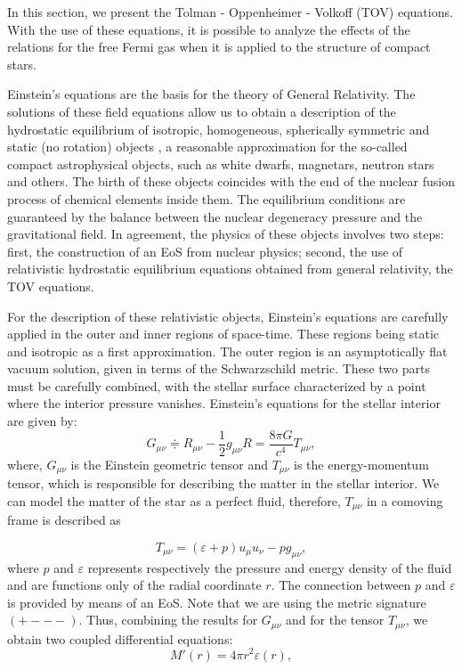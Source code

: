 \documentclass[final,5p,times,twocolumn]{elsarticle}
\begin{document}

In this section, we present the Tolman - Oppenheimer - Volkoff (TOV) equations. With the use of these equations, it is possible to analyze the effects of the  relations for the free Fermi gas when it is applied to the structure of compact stars.

Einstein's equations are the basis for the theory of General Relativity. The solutions of these field equations allow us to obtain a description of the hydrostatic equilibrium of isotropic, homogeneous, spherically symmetric and static (no rotation) objects \cite{Glendenning1997,Carroll2004}, a reasonable approximation for the so-called compact astrophysical objects, such as white dwarfs, magnetars, neutron stars and others. The birth of these objects coincides with the end of the nuclear fusion process of chemical elements inside them. The equilibrium conditions are guaranteed by the balance between the nuclear degeneracy pressure and the gravitational field. In agreement, the physics of these objects involves two steps: first, the construction of an EoS from nuclear physics; second, the use of relativistic hydrostatic equilibrium equations obtained from general relativity, the TOV equations.

For the description of these relativistic objects, Einstein's equations are carefully applied in the outer and inner regions of space-time. These regions being static and isotropic as a first approximation. The outer region is an asymptotically flat vacuum solution, given in terms of the Schwarzschild metric. These two parts must be carefully combined, with the stellar surface characterized by a point where the interior pressure vanishes. Einstein's equations for the stellar interior are given by: 
\begin{equation}
G_{\mu\nu} \doteqdot R_{\mu\nu}-\frac{1}{2}g_{\mu\nu}R = \frac{8\pi G}{c^4} T_{\mu\nu},
\end{equation}
where, $G_{\mu\nu}$ is the Einstein geometric tensor and $T_{\mu\nu}$ is the energy-momentum tensor, which is responsible for describing the matter in the stellar interior. We can model the matter of the star as a perfect fluid, therefore, $T_{\mu\nu}$ in a comoving frame is described as 

\begin{equation}
T_{\mu\nu}=(\varepsilon+p)u_{\mu}u_{\nu}-pg_{\mu\nu},
\end{equation}
where $p$ and $\varepsilon$ represents respectively the pressure and energy density of the fluid and are functions only of the radial coordinate $r$. The connection between $p$ and $\varepsilon$ is provided by means of an EoS. Note that we are using the metric signature $(+---)$. Thus, combining the results for $G_{\mu\nu}$ and for the tensor $T_{\mu\nu}$, we obtain two coupled differential equations: 
\begin{equation}
M'(r)=4\pi r^{2}\varepsilon(r),
\label{neweq1}
\end{equation}
\end{document}
